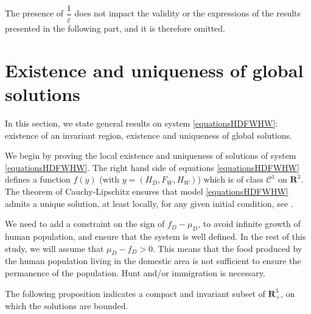 \documentclass{article}
\renewcommand{\epsilon}{\varepsilon}
\begin{document}
The presence of $\dfrac{1}{\epsilon}$ does not impact the validity or the expressions of the results presented in the following part, and it is therefore omitted.


\section{Existence and uniqueness of global solutions}
In this section, we state general results on system \eqref{equationsHDFWHW}:  existence of an invariant region, existence and uniqueness of global solutions.

We begin by proving the local existence and uniqueness of solutions of system \eqref{equationsHDFWHW}. The right hand side of equations \eqref{equationsHDFWHW} defines a function $f(y)$ (with $y = (H_D, F_W, H_W)$) which is of class $\mathcal{C}^1$ on $\mathbf{R}^3$. The theorem of Cauchy-Lipschitz ensures that model \eqref{equationsHDFWHW} admits a unique solution, at least locally, for any given initial condition, see \cite{walter_ordinary_1998}.

We need to add a constraint on the sign of $f_D - \mu_D$, to avoid infinite growth of human population, and ensure that the system is well defined. In the rest of this study, we will assume that $\mu_D-f_D > 0$. This means that the food produced by the human population living in the domestic area is not sufficient to ensure the permanence of the population. Hunt and/or immigration is necessary. 

The following proposition indicates a compact and invariant subset of $\mathbf{R}_+^3$, on which the solutions are bounded.
\end{document}

